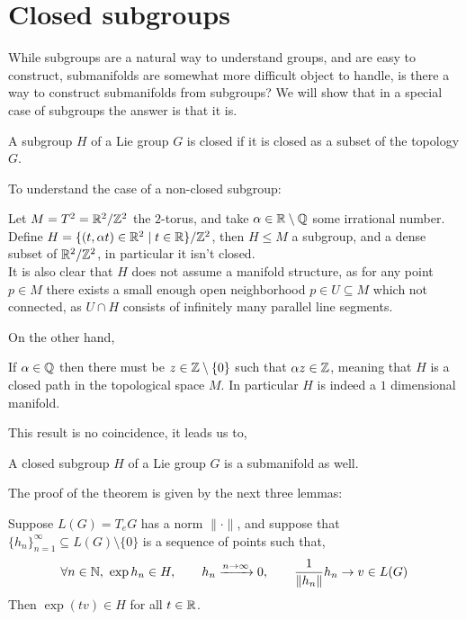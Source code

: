 \section{Closed subgroups}
While subgroups are a natural way to understand groups, and are easy to construct,
submanifolds are somewhat more difficult object to handle, is there a way to construct submanifolds from subgroups?
We will show that in a special case of subgroups the answer is that it is.
\begin{definition}
	A subgroup $H$ of a Lie group $G$ is closed if it is closed as a subset of the topology $G$.
\end{definition}
To understand the case of a non-closed subgroup:
\begin{example}
	Let $M = T^2 = \mathbb{R}^2 / \mathbb{Z}^2$ the $2$-torus, and take $\alpha \in \mathbb{R} \setminus \mathbb{Q}$ some irrational number.
	Define $H = \{ (t, \alpha t) \in \mathbb{R}^2 \mid t \in \mathbb{R} \} / \mathbb{Z}^2$, then $H \le M$ a subgroup, and a dense subset of $\mathbb{R}^2 / \mathbb{Z}^2$, in particular it isn't closed. \\
	It is also clear that $H$ does not assume a manifold structure, as for any point $p \in M$ there exists a small enough open neighborhood $p \in U \subseteq M$ which not connected,
	as $U \cap H$ consists of infinitely many parallel line segments.
\end{example}
On the other hand,
\begin{example}
	If $\alpha \in \mathbb{Q}$ then there must be $z \in \mathbb{Z} \setminus \{ 0 \}$ such that $\alpha z \in \mathbb{Z}$, meaning that $H$ is a closed path in the topological space $M$.
	In particular $H$ is indeed a $1$ dimensional manifold.
\end{example}
This result is no coincidence, it leads us to,
\begin{theorem}\label{theorem_closed_subgroup_is_submanifold}
	A closed subgroup $H$ of a Lie group $G$ is a submanifold as well.
\end{theorem}
The proof of the theorem is given by the next three lemmas:
\begin{lemma}
	Suppose $L(G) = T_e G$ has a norm $\lVert \cdot \rVert$, and suppose that ${\{ h_n \}}_{n = 1}^\infty \subseteq L(G) \setminus \{ 0 \}$ is a sequence of points such that,
	\[
		\forall n \in \mathbb{N},\ \exp h_n \in H,
		\qquad
		h_n \xrightarrow{n \to \infty} 0,
		\qquad
		\frac{1}{\lVert h_n \rVert} h_n \to v \in L(G)
	\]
	Then $\exp(t v) \in H$ for all $t \in \mathbb{R}$.
\end{lemma}\label{lemma_closed_subgroup_1}
